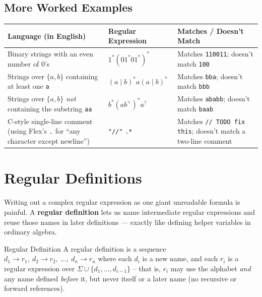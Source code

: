 \documentclass[full-course-notes.tex]{subfiles}
\begin{document}
\subsection{More Worked Examples}
\label{sec:l4-more-worked-examples}

\begin{center}
\renewcommand{\arraystretch}{1.4}
\begin{tabularx}{\textwidth}{@{}X l X@{}}
\toprule
\textbf{Language (in English)} & \textbf{Regular Expression} & \textbf{Matches / Doesn't Match} \\
\midrule
Binary strings with an even number of 0's & $1^{*}(01^{*}01^{*})^{*}$ & Matches \texttt{110011};
doesn't match \texttt{100} \\
Strings over $\{a,b\}$ containing at least one \texttt{a} & $(a\mid b)^{*}a(a\mid b)^{*}$ &
Matches \texttt{bba}; doesn't match \texttt{bbb} \\
Strings over $\{a,b\}$ \emph{not} containing the substring \texttt{aa} & $b^{*}(ab^{+})^{*}a^{?}$
& Matches \texttt{ababb}; doesn't match \texttt{baab} \\
C-style single-line comment (using Flex's \texttt{.} for ``any character except
newline''\footnotemark) & \texttt{"//"} \texttt{.*} & Matches \texttt{// TODO fix this}; doesn't
match a two-line comment \\
\bottomrule
\end{tabularx}
\end{center}

\section{Regular Definitions}
\label{sec:l4-regular-definitions}

\dbtag Writing out a complex regular expression as one giant unreadable formula is painful. A
\textbf{regular definition} lets us name intermediate regular expressions and reuse those names
in later definitions --- exactly like defining helper variables in ordinary algebra.

\begin{defbox}{Regular Definition}
A regular definition is a sequence $d_1 \to r_1,\ d_2 \to r_2,\ \dots,\ d_n \to r_n$ where each
$d_i$ is a new name, and each $r_i$ is a regular expression over $\Sigma \cup \{d_1,\dots,
d_{i-1}\}$ -- that is, $r_i$ may use the alphabet \emph{and} any name defined \emph{before} it,
but never itself or a later name (no recursive or forward references).
\end{defbox}
\end{document}
